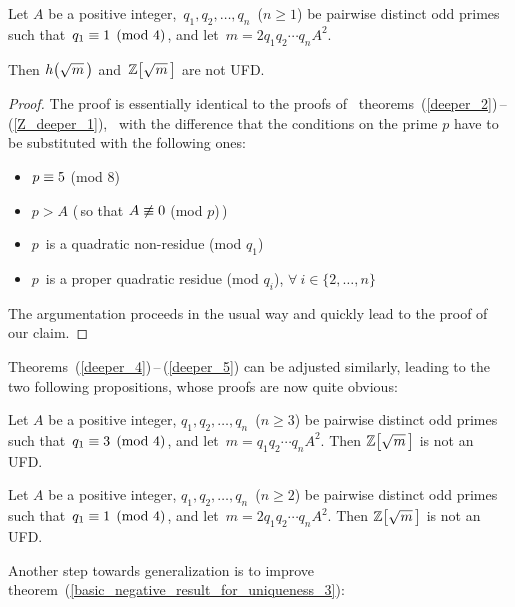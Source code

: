 \begin{thm}\label{Z_deeper_3}
Let $A$ be a positive integer,\, $q_1, q_2, \ldots,
q_n$\, ($n \geq 1$) be pairwise distinct odd primes
such that\, $q_1 \equiv 1 \pmod 4$, and let\,
$m = 2 q_1 q_2 \cdots q_n A^2$.

Then $\hh{m}$ and \,$\ZZ{m}$ are not UFD.
\end{thm}

\begin{proof}
%
The proof is essentially identical to the proofs of
\mbox{%
theorems (\ref{deeper_2})\,--\,(\ref{Z_deeper_1}),%
} with the difference that the conditions on the prime
$p$ have to be substituted with the following ones:
\begin{itemize}

\item $p \equiv 5$ (mod $8$)

\item $p > A$\: (\,so that $A \not\equiv 0$
(mod $p$)\,)

\item $p$\, is a quadratic non-residue (mod $q_1$)

\item $p$\, is a proper quadratic residue (mod $q_i$),
$\forall\: i \in \{2, \ldots, n\}$

\end{itemize}

The argumentation proceeds in the usual way and
quickly lead to the proof of our claim.
%
\end{proof}

\mbox{Theorems (\ref{deeper_4})\,--\,(\ref{deeper_5})}
can be adjusted similarly, leading to the two following
propositions, whose proofs are now quite obvious:

\begin{thm}\label{Z_deeper_4}
Let $A$ be a positive integer, $q_1, q_2, \ldots, q_n$\,
($n \geq 3$) be pairwise distinct odd primes
such that\, $q_1 \equiv 3 \pmod 4$, and let\,
$m = q_1 q_2 \cdots q_n A^2$.
Then $\ZZ{m}$ is not an UFD.
\end{thm}

\begin{thm}\label{Z_deeper_5}
Let $A$ be a positive integer, $q_1, q_2, \ldots,
q_n$\, ($n \geq 2$) be pairwise distinct odd primes
such that\, $q_1 \equiv 1 \pmod 4$,
and let\, $m = 2 q_1 q_2 \cdots q_n A^2$.
Then $\ZZ{m}$ is not an UFD.
\end{thm}

\smallskip
Another step towards generalization is to improve
theorem~(\ref{basic_negative_result_for_uniqueness_3}):

